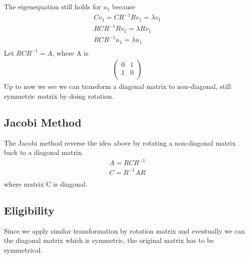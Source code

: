 \documentclass[a4paper]{article}
\begin{document}
The eigenequation still holds for $u_1$ because
\begin{align*}
	C v_1 = C R^{-1} R v_1 = \lambda v_1 \\
	R C R^{-1} R v_1 = \lambda R v_1 \\
	R C R^{-1} u_1 = \lambda  u_1 \\
\end{align*}
Let $R C R^{-1} = A $, where A is
\begin{align*}
	\left( \begin{array}{cc}	
		0 & 1\\
		1 & 0\\
\end{array} \right)
\end{align*}
Up to now we see we can transform a diagonal matrix to non-diagonal, still symmetric matrix by doing rotation. \\
\subsection{Jacobi Method}
The Jacobi method reverse the idea above by rotating a non-diagonal matrix back to a diagonal matrix. 
\begin{align*}
	A = R C R^{-1} \\
	C = R^{-1} A R \\
\end{align*}
where matrix C is diagonal.\\
\subsection{Eligibility}
Since we apply similar transformation by rotation matrix and eventually we can the diagonal matrix which is symmetric, the original matrix has to be symmetrical.\\
\end{document}
